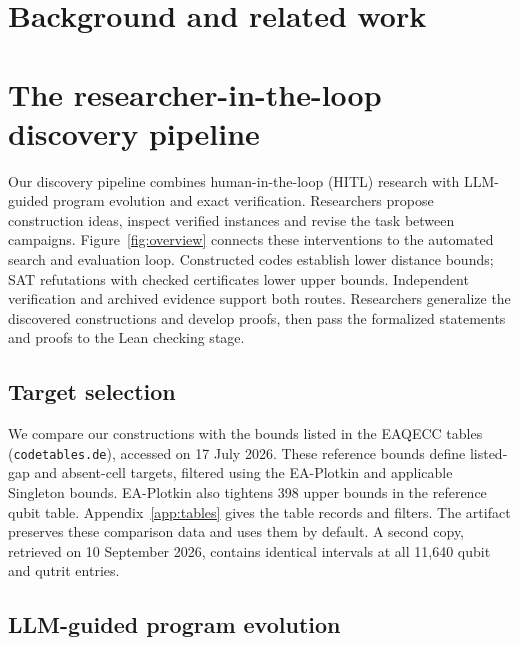 \documentclass{article}
\begin{document}
\section{Background and related work}\label{sec:related}



\section{The researcher-in-the-loop discovery pipeline}\label{sec:pipeline}

Our discovery pipeline combines human-in-the-loop (HITL) research with
LLM-guided program evolution and exact verification. Researchers propose
construction ideas, inspect verified instances and revise the task between
campaigns. Figure~\ref{fig:overview} connects these interventions to the
automated search and evaluation loop. Constructed codes establish lower
distance bounds; SAT refutations with checked certificates lower upper
bounds. Independent verification and archived evidence support both routes.
Researchers generalize the discovered constructions and develop proofs,
then pass the formalized statements and proofs to the Lean checking stage.



\subsection{Target selection}

We compare our constructions with the bounds listed in the EAQECC tables
(\texttt{codetables.de}), accessed on 17 July 2026. These reference bounds
define listed-gap and absent-cell targets, filtered using the EA-Plotkin
and applicable Singleton bounds. EA-Plotkin also tightens 398 upper bounds
in the reference qubit table. Appendix~\ref{app:tables} gives the table
records and filters. The artifact preserves these comparison data and
uses them by default. A second copy, retrieved on 10 September 2026,
contains identical intervals at all 11,640 qubit and qutrit entries.

\subsection{LLM-guided program evolution}
\end{document}
